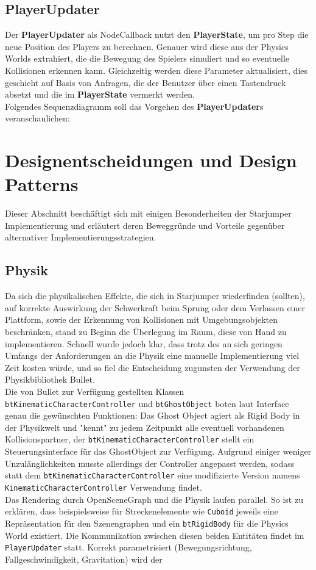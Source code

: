 \documentclass{llncs}
\begin{document}
\subsection{PlayerUpdater}
Der \textbf{PlayerUpdater} als NodeCallback nutzt den \textbf{PlayerState}, um pro Step die neue Position des Players
zu berechnen. Genauer wird diese aus der Physics Worlds extrahiert, die die Bewegung des Spielers simuliert und so
eventuelle Kollisionen erkennen kann. Gleichzeitig werden diese Parameter aktualisiert, dies geschieht auf Basis von
Anfragen, die der Benutzer \"uber einen Tastendruck absetzt und die im \textbf{PlayerState} vermerkt werden.\\
Folgendes Sequenzdiagramm soll das Vorgehen des \textbf{PlayerUpdater}s veranschaulichen:

\section{Designentscheidungen und Design Patterns}
Dieser Abschnitt besch\"aftigt sich mit einigen Besonderheiten der Starjumper Implementierung und erl\"autert deren
Beweggr\"unde und Vorteile gegen\"uber alternativer Implementierungsstrategien.

\subsection{Physik}
Da sich die physikalischen Effekte, die sich in Starjumper wiederfinden (sollten), auf korrekte Auswirkung der Schwerkraft
beim Sprung oder dem Verlassen einer Plattform, sowie der Erkennung von Kollisionen mit Umgebungsobjekten beschr\"anken,
stand zu Beginn die \"Uberlegung im Raum, diese von Hand zu implementieren. Schnell wurde jedoch klar, dass trotz des
an sich geringen Umfangs der Anforderungen an die Physik eine manuelle Implementierung viel Zeit kosten w\"urde, und so fiel
die Entscheidung zugunsten der Verwendung der Physikbibliothek Bullet.\\
Die von Bullet zur Verf\"ugung gestellten Klassen \texttt{btKinematicCharacterController} und \texttt{btGhostObject} boten
laut Interface genau die gew\"unschten Funktionen: Das Ghost Object agiert als Rigid Body in der Physikwelt und "kennt"
zu jedem Zeitpunkt alle eventuell vorhandenen Kollisionspartner, der \texttt{btKinematicCharacterController} stellt ein
Steuerungsinterface f\"ur das GhostObject zur Verf\"ugung. Aufgrund einiger weniger Unzul\"anglichkeiten musste allerdings
der Controller angepasst werden, sodass statt dem \texttt{btKinematicCharacterController} eine modifizierte Version
namens \texttt{KinematicCharacterController} Verwendung findet.\\
Das Rendering durch OpenSceneGraph und die Physik laufen parallel. So ist zu erkl\"aren, dass beispielsweise f\"ur
Streckenelemente wie \texttt{Cuboid} jeweils eine Repr\"asentation f\"ur den Szenengraphen und ein \texttt{btRigidBody}
f\"ur die Physics World existiert. Die Kommunikation zwischen diesen beiden Entit\"aten findet im \texttt{PlayerUpdater}
statt. Korrekt parametrisiert (Bewegungsrichtung, Fallgeschwindigkeit, Gravitation) wird der 
\end{document}

